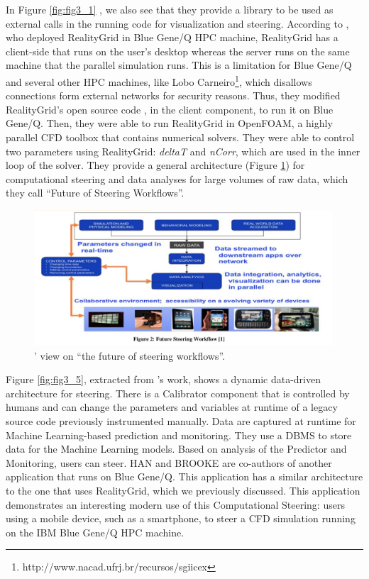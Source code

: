In Figure \ref{fig:fig3_1} \cite{Pickles2005practical},
we also see that they provide a library to be used as external calls in the
running code for visualization and steering. According to \citet{Danani2015Computational}, who deployed RealityGrid in Blue Gene/Q HPC machine,
RealityGrid has a client-side that runs on the user's desktop whereas
the server runs on the same machine that the parallel simulation runs.
This is a limitation for Blue Gene/Q and several other HPC machines,
like Lobo Carneiro\footnote{http://www.nacad.ufrj.br/recursos/sgiicex},
which disallows connections form external networks for security reasons.
Thus, they modified RealityGrid's open source code
\cite{RealityGrid},
in the client component, to run it on Blue Gene/Q. Then, they were able
to run RealityGrid in OpenFOAM, a highly parallel CFD toolbox that
contains numerical solvers. They were able to control two
parameters using RealityGrid: \emph{deltaT} and \emph{nCorr}, which are
used in the inner loop of the solver. They provide a general
architecture (Figure \ref{fig:fig3_9}) for computational steering and data analyses
for large volumes of raw data, which they call ``Future of Steering
Workflows''.

\begin{figure}[H]
    \centering
    \includegraphics[width=420px,trim={0 1cm 0 0},clip,keepaspectratio]{img/media/image18.png}
    \caption{\citet{Danani2015Computational}' view on ``the future of steering workflows''.}
    \label{fig:fig3_9}
\end{figure}


Figure \ref{fig:fig3_5}, extracted from \citet{Han2016Hybrid}'s work,
shows a dynamic data-driven architecture for steering. There is a
Calibrator component that is controlled by humans and can change the
parameters and variables at runtime of a legacy source code previously
instrumented manually. Data are captured at runtime for Machine
Learning-based prediction and monitoring. They use a DBMS to store data
for the Machine Learning models. Based on analysis of the Predictor and
Monitoring, users can steer. HAN and BROOKE
are co-authors of another application
\cite{Han2014Virtual}
that runs on Blue Gene/Q. This application has a similar architecture to
the one that uses RealityGrid, which we previously discussed. This
application demonstrates an interesting modern use of this Computational
Steering: users using a mobile device, such as a smartphone, to steer a
CFD simulation running on the IBM Blue Gene/Q HPC machine.


